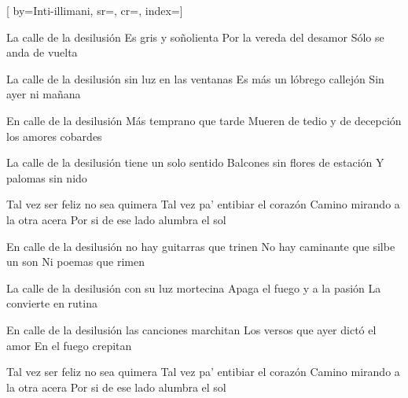 [
        by={Inti-illimani},
        sr={},
        cr={},
        index={}]

\beginverse
La calle de la desilusión
Es gris y soñolienta
Por la vereda del desamor
Sólo se anda de vuelta
\endverse

\beginverse
La calle de la desilusión
sin luz en las ventanas
Es más un lóbrego callejón
Sin ayer ni mañana
\endverse

\beginverse
En calle de la desilusión
Más temprano que tarde
Mueren de tedio y de decepción
los amores cobardes
\endverse

\beginverse
La calle de la desilusión
tiene un solo sentido
Balcones sin flores de estación
Y palomas sin nido
\endverse

\beginverse
Tal vez ser feliz no sea quimera
Tal vez pa' entibiar el corazón
Camino mirando a la otra acera
Por si de ese lado alumbra el sol
\endverse

\beginverse
En calle de la desilusión
no hay guitarras que trinen
No hay caminante que silbe un son
Ni poemas que rimen
\endverse

\beginverse
La calle de la desilusión
con su luz mortecina
Apaga el fuego y a la pasión
La convierte en rutina
\endverse

\beginverse
En calle de la desilusión
las canciones marchitan
Los versos que ayer dictó el amor
En el fuego crepitan
\endverse

\beginverse
Tal vez ser feliz no sea quimera
Tal vez pa' entibiar el corazón
Camino mirando a la otra acera
Por si de ese lado alumbra el sol
\endverse



\endsong